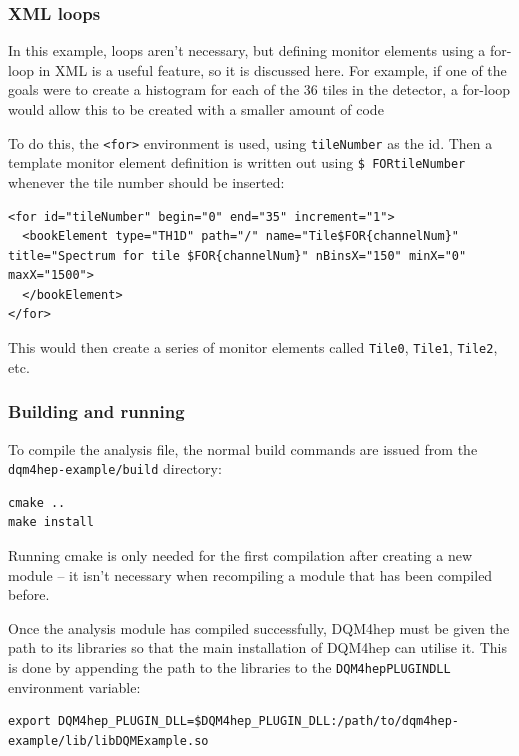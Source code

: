 \subsubsection{XML loops}
In this example, loops aren't necessary, but defining monitor elements using a for-loop in \acrshort{XML} is a useful feature, so it is discussed here. For example, if one of the goals were to create a histogram for each of the 36 tiles in the detector, a for-loop would allow this to be created with a smaller amount of code

To do this, the \texttt{<for>} environment is used, using \texttt{tileNumber} as the id. Then a template monitor element definition is written out using \texttt{\$ FOR{tileNumber}} whenever the tile number should be inserted:

\begin{lstlisting}
<for id="tileNumber" begin="0" end="35" increment="1">
  <bookElement type="TH1D" path="/" name="Tile$FOR{channelNum}" title="Spectrum for tile $FOR{channelNum}" nBinsX="150" minX="0" maxX="1500">
  </bookElement>
</for>
\end{lstlisting}

This would then create a series of monitor elements called \texttt{Tile0}, \texttt{Tile1}, \texttt{Tile2}, etc.

\subsubsection{Building and running}
To compile the analysis file, the normal build commands are issued from the \texttt{dqm4hep-example/build} directory:

\begin{lstlisting}
cmake ..
make install
\end{lstlisting}

Running cmake is only needed for the first compilation after creating a new module – it isn't necessary when recompiling a module that has been compiled before.

Once the analysis module has compiled successfully, \acrshort{DQM4hep} must be given the path to its libraries so that the main installation of \acrshort{DQM4hep} can utilise it. This is done by appending the path to the libraries to the \texttt{DQM4hep\textunderscore PLUGIN\textunderscore DLL} environment variable:

\begin{lstlisting}
export DQM4hep_PLUGIN_DLL=$DQM4hep_PLUGIN_DLL:/path/to/dqm4hep-example/lib/libDQMExample.so
\end{lstlisting}

